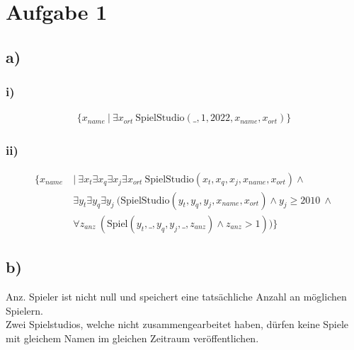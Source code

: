 \section*{Aufgabe 1}
\subsection*{a)}
\subsubsection*{i)}
\begin{align*}
\{ x _{ name }\ |\ \exists x _{ ort }\ \text{SpielStudio}(\_,1,2022,x _{ name } , x _{ ort } ) \}
\end{align*}
\subsubsection*{ii)}
\begin{align*}
  \{ x _{ name }\ &|\ \exists x_t \exists x_q \exists x_j \exists x _{ ort }\ \text{SpielStudio}(x_t,x_q,x_j,x _{ name } , x _{ ort } )\land \\
  &\exists y_t \exists y_q \exists y_j\ (\text{SpielStudio}(y_t,y_q,y_j,x _{ name } , x _{ ort } ) \land y_j \ge 2010\ \land \\
  & \forall z _{ anz }\ (\text{Spiel}(y_t,\_,y_q,y_j,\_,z _{ anz } ) \land z _{ anz } > 1))\}
\end{align*}
\subsection*{b)}
Anz. Spieler ist nicht null und speichert eine tatsächliche Anzahl an möglichen Spielern.\\
Zwei Spielstudios, welche nicht zusammengearbeitet haben, dürfen keine Spiele mit gleichem Namen im gleichen Zeitraum veröffentlichen.

